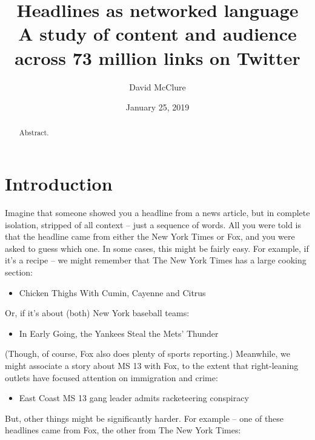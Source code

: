 \documentclass{scrartcl}
\begin{document}
\title{%
  \vspace{-2cm}Headlines as networked language\vspace{1ex} \\
  \large A study of content and audience across 73 million links on Twitter
}

\author{David McClure}

\date{January 25, 2019}

\maketitle

\begin{abstract}
  Abstract.
\end{abstract}

\section{Introduction}

Imagine that someone showed you a headline from a news article, but in complete isolation, stripped of all context -- just a sequence of words. All you were told is that the headline came from either the New York Times or Fox, and you were asked to guess which one. In some cases, this might be fairly easy. For example, if it's a recipe -- we might remember that The New York Times has a large cooking section:

\begin{itemize}
  \item Chicken Thighs With Cumin, Cayenne and Citrus
\end{itemize}

Or, if it's about (both) New York baseball teams:

\begin{itemize}
  \item In Early Going, the Yankees Steal the Mets' Thunder
\end{itemize}

(Though, of course, Fox also does plenty of sports reporting.) Meanwhile, we might associate a story about MS 13 with Fox, to the extent that right-leaning outlets have focused attention on immigration and crime:

\begin{itemize}
  \item East Coast MS 13 gang leader admits racketeering conspiracy
\end{itemize}

But, other things might be significantly harder. For example -- one of these headlines came from Fox, the other from The New York Times:
\end{document}
